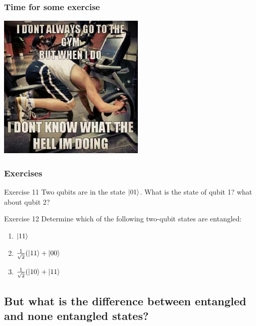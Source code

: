 \documentclass[10pt]{beamer}
\begin{document}
\begin{frame}
  \frametitle{Time for some exercise}
  \centering
  \includegraphics[width=7cm]{img/exercise-meme.jpg}
\end{frame}

\begin{frame}
  \frametitle{Exercises}
  \begin{block}{Exercise 11}
    Two qubits are in the state $\ket{01}$. What is the state of  qubit 1? what about qubit 2?
  \end{block}
  \begin{block}{Exercise 12}
    Determine which of the following two-qubit states are entangled: 
         \begin{enumerate}
             \item $\ket{11}$
             \item $\frac{1}{\sqrt{2}}(\ket{11}+\ket{00}$
             \item $\frac{1}{\sqrt{2}}(\ket{10}+\ket{11}$ 
         \end{enumerate}
  \end{block}
\end{frame}

\begin{frame}
 \section{But what is the difference between entangled and none entangled states?}
\end{frame}
\end{document}
